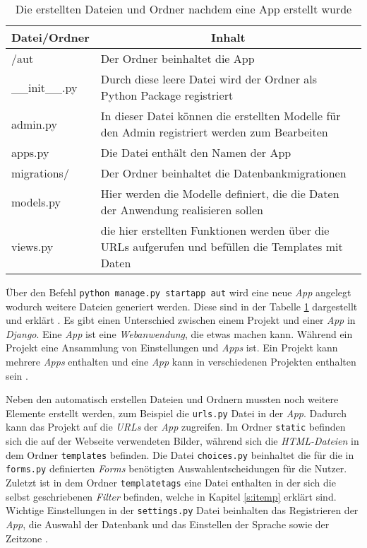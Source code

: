 \documentclass[11pt,a4paper]{report}
\begin{document}
\begin{table}
\centering
\begin{tabular}{|p{}|p{}|}
\hline
\multicolumn{1}{|c|}{\textbf{Datei/Ordner}} & 
\multicolumn{1}{|c|}{\textbf{Inhalt}} \\\hline

/aut & Der Ordner beinhaltet die App\\\hline

\_\_init\_\_.py & Durch diese leere Datei wird der Ordner als Python Package registriert \\\hline

admin.py & In dieser Datei können die erstellten Modelle für den Admin registriert werden zum Bearbeiten\\\hline

apps.py & Die Datei enthält den Namen der App\\\hline

migrations/ & Der Ordner beinhaltet die Datenbankmigrationen\\\hline


models.py & Hier werden die Modelle definiert, die die Daten der Anwendung realisieren sollen\\\hline
views.py & die hier erstellten Funktionen werden über die URLs aufgerufen und befüllen die Templates mit Daten\\\hline
\end{tabular}
\caption{Die erstellten Dateien und Ordner nachdem eine App erstellt wurde}
\label{tab:AutoCode2}
\end{table}


Über den Befehl \verb|python manage.py startapp aut| wird eine neue \textit{App} angelegt wodurch weitere Dateien generiert werden. Diese sind in der Tabelle \ref{tab:AutoCode2} dargestellt und erklärt \cite{djangotuto3}. Es gibt einen Unterschied zwischen einem Projekt und einer \textit{App} in \textit{Django}. Eine \textit{App} ist eine \textit{Webanwendung}, die etwas machen kann. Während ein Projekt eine Ansammlung von Einstellungen und \textit{Apps} ist. Ein Projekt kann mehrere \textit{Apps} enthalten und eine \textit{App} kann in verschiedenen Projekten enthalten sein \cite{djangotuto3}.


Neben den automatisch erstellen Dateien und Ordnern mussten noch weitere Elemente erstellt werden, zum Beispiel die \verb|urls.py| Datei in der \textit{App}. Dadurch kann das Projekt auf die \textit{URLs} der \textit{App} zugreifen. Im Ordner \verb|static| befinden sich die auf der Webseite verwendeten Bilder, während sich die \textit{HTML-Dateien} in dem Ordner \verb|templates| befinden. Die Datei \verb|choices.py| beinhaltet die für die in \verb|forms.py| definierten \textit{Forms} benötigten Auswahlentscheidungen für die Nutzer. Zuletzt ist in dem Ordner \verb|templatetags| eine Datei enthalten in der sich die selbst geschriebenen \textit{Filter} befinden, welche in Kapitel \ref{s:itemp} erklärt sind. Wichtige Einstellungen in der \verb|settings.py| Datei beinhalten das Registrieren der \textit{App}, die Auswahl der Datenbank und das Einstellen der Sprache sowie der Zeitzone \cite{mozillatuto4}.
\end{document}
